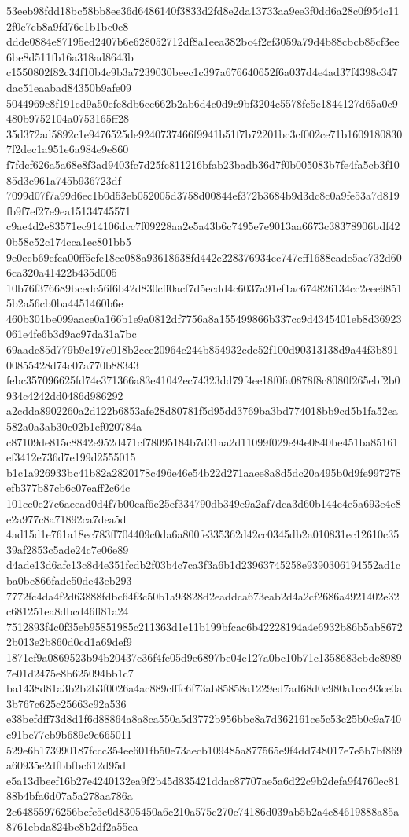 {53eeb98fdd18bc58bb8ee36d6486140f3833d2fd8e2da13733aa9ee3f0dd6a28c0f954c112f0c7cb8a9fd76e1b1bc0c8
ddde0884e87195ed2407b6e628052712df8a1eea382bc4f2ef3059a79d4b88cbcb85cf3ee6be8d511fb16a318ad8643b
c1550802f82c34f10b4c9b3a7239030beec1c397a676640652f6a037d4e4ad37f4398c347dac51eaabad84350b9afe09
5044969c8f191cd9a50efe8db6cc662b2ab6d4c0d9c9bf3204c5578fe5e1844127d65a0e9480b9752104a0753165ff28
35d372ad5892c1e9476525de9240737466f9941b51f7b72201bc3cf002ce71b16091808307f2dec1a951e6a984e9e860
f7fdcf626a5a68e8f3ad9403fc7d25fc811216bfab23badb36d7f0b005083b7fe4fa5cb3f1085d3c961a745b936723df
7099d07f7a99d6ec1b0d53eb052005d3758d00844ef372b3684b9d3dc8c0a9fe53a7d819fb9f7ef27e9ea15134745571
c9ae4d2e83571ec914106dcc7f09228aa2e5a43b6c7495e7e9013aa6673c38378906bdf420b58c52c174cca1ec801bb5
9e0ecb69efca00ff5cfe18cc088a93618638fd442e228376934cc747eff1688eade5ac732d606ca320a41422b435d005
10b76f376689bcedc56f6b42d830cff0acf7d5ecdd4c6037a91ef1ac674826134cc2eee98515b2a56cb0ba4451460b6e
460b301be099aace0a166b1e9a0812df7756a8a155499866b337cc9d4345401eb8d36923061e4fe6b3d9ac97da31a7bc
69aadc85d779b9c197c018b2cee20964c244b854932cde52f100d90313138d9a44f3b89100855428d74c07a770b88343
febc357096625fd74e371366a83e41042ec74323dd79f4ee18f0fa0878f8c8080f265ebf2b0934c4242dd0486d986292
a2cdda8902260a2d122b6853afe28d80781f5d95dd3769ba3bd774018bb9cd5b1fa52ea582a0a3ab30c02b1ef020784a
c87109de815c8842e952d471cf78095184b7d31aa2d11099f029e94e0840be451ba85161ef3412e736d7e199d2555015
b1c1a926933bc41b82a2820178c496e46e54b22d271aaee8a8d5dc20a495b0d9fe997278efb377b87cb6c07eaff2c64c
101cc0e27c6aeead0d4f7b00caf6c25ef334790db349e9a2af7dca3d60b144e4e5a693e4e8e2a977c8a71892ca7dea5d
4ad15d1e761a18ec783ff704409c0da6a800fe335362d42cc0345db2a010831ec12610c3539af2853c5ade24c7e06e89
d4ade13d6afc13c8d4e351fcdb2f03b4c7ca3f3a6b1d23963745258e9390306194552ad1cba0be866fade50de43eb293
7772fc4da4f2d63888fdbc64f3c50b1a93828d2eaddca673eab2d4a2cf2686a4921402e32c681251ea8dbcd46ff81a24
7512893f4c0f35eb95851985c211363d1e11b199bfcac6b42228194a4e6932b86b5ab86722b013e2b860d0cd1a69def9
1871ef9a0869523b94b20437c36f4fe05d9e6897be04e127a0bc10b71c1358683ebdc89897e01d2475e8b625094bb1c7
ba1438d81a3b2b2b3f0026a4ac889cfffc6f73ab85858a1229ed7ad68d0c980a1ccc93ce0a3b767c625c25663c92a536
e38befdff73d8d1f6d88864a8a8ca550a5d3772b956bbc8a7d362161ce5c53c25b0c9a740c91be77eb9b689c9e665011
529e6b173990187fccc354ee601fb50e73aecb109485a877565e9f4dd748017e7e5b7bf869a60935e2dfbbfbc612d95d
e5a13dbeef16b27e4240132ea9f2b45d835421ddac87707ae5a6d22c9b2defa9f4760ec8188b4bfa6d07a5a278aa786a
2c64855976256bcfc5e0d8305450a6c210a575c270c74186d039ab5b2a4c84619888a85a8761ebda824bc8b2df2a55ca
}
